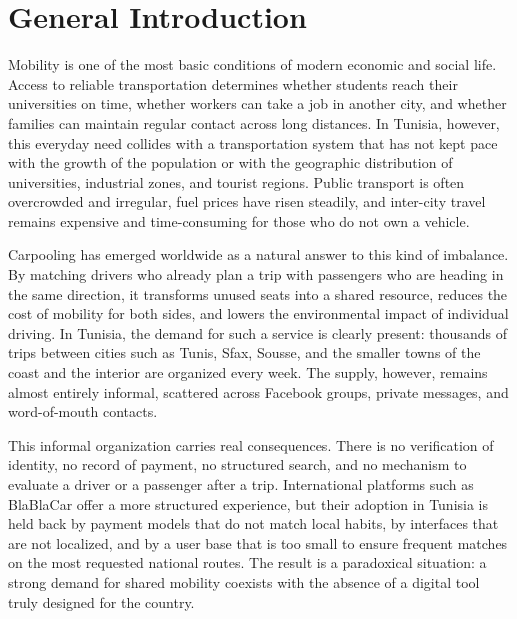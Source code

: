 \chapter*{General Introduction}

Mobility is one of the most basic conditions of modern economic and social life. Access to reliable transportation determines whether students reach their universities on time, whether workers can take a job in another city, and whether families can maintain regular contact across long distances. In Tunisia, however, this everyday need collides with a transportation system that has not kept pace with the growth of the population or with the geographic distribution of universities, industrial zones, and tourist regions. Public transport is often overcrowded and irregular, fuel prices have risen steadily, and inter-city travel remains expensive and time-consuming for those who do not own a vehicle.

Carpooling has emerged worldwide as a natural answer to this kind of imbalance. By matching drivers who already plan a trip with passengers who are heading in the same direction, it transforms unused seats into a shared resource, reduces the cost of mobility for both sides, and lowers the environmental impact of individual driving. In Tunisia, the demand for such a service is clearly present: thousands of trips between cities such as Tunis, Sfax, Sousse, and the smaller towns of the coast and the interior are organized every week. The supply, however, remains almost entirely informal, scattered across Facebook groups, private messages, and word-of-mouth contacts.

This informal organization carries real consequences. There is no verification of identity, no record of payment, no structured search, and no mechanism to evaluate a driver or a passenger after a trip. International platforms such as BlaBlaCar offer a more structured experience, but their adoption in Tunisia is held back by payment models that do not match local habits, by interfaces that are not localized, and by a user base that is too small to ensure frequent matches on the most requested national routes. The result is a paradoxical situation: a strong demand for shared mobility coexists with the absence of a digital tool truly designed for the country.

